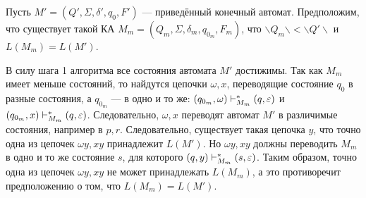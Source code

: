 \begin{myproof} Пусть $M' = (Q',\Sigma, \delta', q_0, F')$ --- 
приведённый конечный автомат. Предположим, что существует такой КА $M_m 
= (Q_m,\Sigma, \delta_m, q_{0_m}, F_m)$, что $\backslash Q_m \backslash 
< \backslash Q' \backslash$ и $L(M_m) = L(M')$.

В силу шага 1 алгоритма все состояния автомата $M'$ достижимы. Так как 
$M_m$ имеет меньше состояний, то найдутся цепочки $\omega, x$, 
переводящие состояние $q_0$ в разные состояния, а  $q_{0_m}$ --- в одно 
и то же: $(q_{0_m}, \omega) \vdash_{M_m}^* (q, \varepsilon)$ и $(q_{0_m}, x) 
\vdash_{M_m}^* (q, \varepsilon)$. Следовательно, $\omega, x$ переводят автомат 
$M'$  в различимые состояния, например в $p, r$. Следовательно, 
существует такая цепочка $y$, что точно одна из цепочек $\omega y, xy$ 
принадлежит $L(M')$. Но  $\omega y, xy$ должны переводить $M_m$ в одно 
и то же состояние $s$, для которого $(q, y) \vdash_{M_m}^* (s, \varepsilon)$. 
Таким образом, точно одна из цепочек $\omega y, xy$ не может 
принадлежать $L(M_m)$, а это противоречит предположению о том, что 
$L(M_m) = L(M')$. 
\end{myproof}



